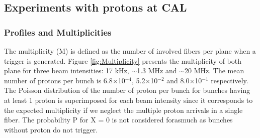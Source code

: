 \documentclass[a4paper,11pt]{article}
\begin{document}
\subsection{Experiments with protons at CAL}
\subsubsection{Profiles and Multiplicities}
\label{Profiles_And_Multiplies}
The multiplicity (M) is defined as the number of involved fibers per plane when a trigger is generated.
Figure \ref{fig:Multiplicity} presents the multiplicity of both plane for three beam intensities: 17 kHz, $\sim$1.3 MHz and $\sim$20 MHz. The mean number of protons per bunch is 6.8$\times$10$^{-4}$, 5.2$\times$10$^{-2}$ and 8.0$\times$10$^{-1}$ respectively. The Poisson distribution of the number of proton per bunch for bunches having at least 1 proton is superimposed for each beam intensity since it corresponds to the expected multiplicity if we neglect the multiple proton arrivals in a single fiber. The probability P for X = 0 is not considered forasmuch as bunches without proton do not trigger. \\
\end{document}
